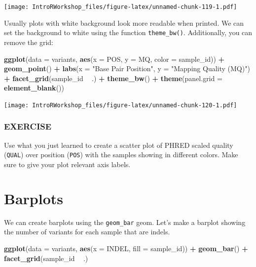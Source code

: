 \documentclass[]{book}
\newenvironment{Shaded}{\begin{snugshade}}{\end{snugshade}}
\newcommand{\DataTypeTok}[1]{\textcolor[rgb]{0.13,0.29,0.53}{#1}}
\newcommand{\KeywordTok}[1]{\textcolor[rgb]{0.13,0.29,0.53}{\textbf{#1}}}
\newcommand{\NormalTok}[1]{#1}
\newcommand{\OperatorTok}[1]{\textcolor[rgb]{0.81,0.36,0.00}{\textbf{#1}}}
\newcommand{\StringTok}[1]{\textcolor[rgb]{0.31,0.60,0.02}{#1}}
\begin{document}
\texttt{[image: IntroRWorkshop\_files/figure-latex/unnamed-chunk-119-1.pdf]}

Usually plots with white background look more readable when printed. We can set the background to white using the function \texttt{theme\_bw()}. Additionally, you can remove the grid:

\begin{Shaded}
\begin{Highlighting}[]
\KeywordTok{ggplot}\NormalTok{(}\DataTypeTok{data =}\NormalTok{ variants, }\KeywordTok{aes}\NormalTok{(}\DataTypeTok{x =}\NormalTok{ POS, }\DataTypeTok{y =}\NormalTok{ MQ, }\DataTypeTok{color =}\NormalTok{ sample_id)) }\OperatorTok{+}\StringTok{ }
\StringTok{  }\KeywordTok{geom_point}\NormalTok{() }\OperatorTok{+}\StringTok{ }
\StringTok{  }\KeywordTok{labs}\NormalTok{(}\DataTypeTok{x =} \StringTok{"Base Pair Position"}\NormalTok{, }
       \DataTypeTok{y =} \StringTok{"Mapping Quality (MQ)"}\NormalTok{) }\OperatorTok{+}\StringTok{ }
\StringTok{  }\KeywordTok{facet_grid}\NormalTok{(sample_id }\OperatorTok{~}\StringTok{ }\NormalTok{.) }\OperatorTok{+}
\StringTok{  }\KeywordTok{theme_bw}\NormalTok{() }\OperatorTok{+}
\StringTok{  }\KeywordTok{theme}\NormalTok{(}\DataTypeTok{panel.grid =} \KeywordTok{element_blank}\NormalTok{())}
\end{Highlighting}
\end{Shaded}

\texttt{[image: IntroRWorkshop\_files/figure-latex/unnamed-chunk-120-1.pdf]}

\hypertarget{exercise-25}{%
\subsubsection*{EXERCISE}\label{exercise-25}}

Use what you just learned to create a scatter plot of PHRED scaled quality (\texttt{QUAL}) over position (\texttt{POS}) with the samples showing in different colors. Make sure to give your plot relevant axis labels.

\hypertarget{barplots}{%
\section{Barplots}\label{barplots}}

We can create barplots using the \texttt{geom\_bar} geom. Let's make a barplot showing the number of variants for each sample that are indels.

\begin{Shaded}
\begin{Highlighting}[]
\KeywordTok{ggplot}\NormalTok{(}\DataTypeTok{data =}\NormalTok{ variants, }\KeywordTok{aes}\NormalTok{(}\DataTypeTok{x =}\NormalTok{ INDEL, }\DataTypeTok{fill =}\NormalTok{ sample_id)) }\OperatorTok{+}\StringTok{ }
\StringTok{  }\KeywordTok{geom_bar}\NormalTok{() }\OperatorTok{+}
\StringTok{  }\KeywordTok{facet_grid}\NormalTok{(sample_id }\OperatorTok{~}\StringTok{ }\NormalTok{.)}
\end{Highlighting}
\end{Shaded}
\end{document}
